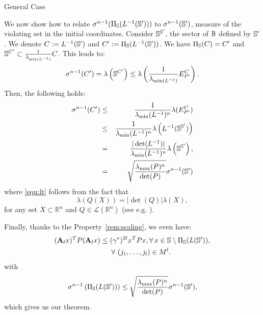 \begin{subsection}{General Case}
\begin{pf}
We now show how to relate $\sigma^{n-1}(\Pi_{\mathbb{S}}(L^{-1}(\mathbb{S}')))$ to $\sigma^{n-1}(\mathbb{S}')$, measure of the violating set in the initial coordinates. Consider $\mathbb{S}^{\mathbb{S}'}$, the sector of $\mathbb{B}$ defined by $\mathbb{S}'$. We denote $C:= L^{-1}(\mathbb{S}')$ and $C':=\Pi_{\mathbb{S}}(L^{-1}(\mathbb{S}'))$. We have $\Pi_{\mathbb{S}}(C) = C'$ and $\mathbb{S}^{C'} \subset \frac{1}{ \lambda_{\min (L^{-1})}} C$. This leads to:
$$\sigma^{n-1}(C') = \lambda \left( \mathbb{S}^{C'} \right) \leq \lambda \left( \frac{1}{ \lambda_{\min (L^{-1})}} E_{P'}^{C} \right).$$ Then, the following holds: \begin{eqnarray}
\nonumber\sigma^{n-1}(C') &\leq& \frac{1}{\lambda_{\min}(L^{-1})^n}\lambda(E_{P'}^{C}) \\
\nonumber &\leq&\frac{1}{\lambda_{\min}(L^{-1})^n} \lambda \left( L^{-1}(\mathbb{S}^{\mathbb{S}'}) \right)\\ 
\label{eqn:lt} &=&\frac{|\det(L^{-1})|}{\lambda_{\min}(L^{-1})^n}\lambda \left( \mathbb{S}^{\mathbb{S}'} \right),\\
\label{eqn:map1} &=&\sqrt{\frac{\lambda_{\max}(P)^n}{\det(P)}}\sigma^{n-1}(\mathbb{S}')
\end{eqnarray}
where \eqref{eqn:lt} follows from the fact that
$$ \lambda(Q(X)) = |\det(Q)| \lambda(X),$$
for any set $X \subset \mathbb{R}^n$ and $Q \in \mathcal{L}(\mathbb{R}^n)$ (see e.g. \cite{rudin}).

Finally, thanks to the Property~\ref{rem:scaling}, we even have:
\begin{equation}\label{eqn:P1}
\begin{aligned}
& (\mathbf{A}_l x)^T P (\mathbf{A}_l x) \leq (\gamma^*)^{2l} x^T P x,  \forall\, x \in \mathbb{S} \setminus \Pi_{\mathbb{S}}(L(\mathbb{S}')), \\
& \qquad \qquad \qquad \qquad \forall\ (j_1,\dots,j_l) \in M^l.
\end{aligned}
\end{equation}
with $$\sigma^{n-1} \left(  \Pi_{\mathbb{S}}(L(\mathbb{S}')) \right) \leq \sqrt{\frac{\lambda_{\max}(P)^n}{\det(P)}}\sigma^{n-1}(\mathbb{S}'), $$ which gives us our theorem.
\end{pf}

\end{subsection}
